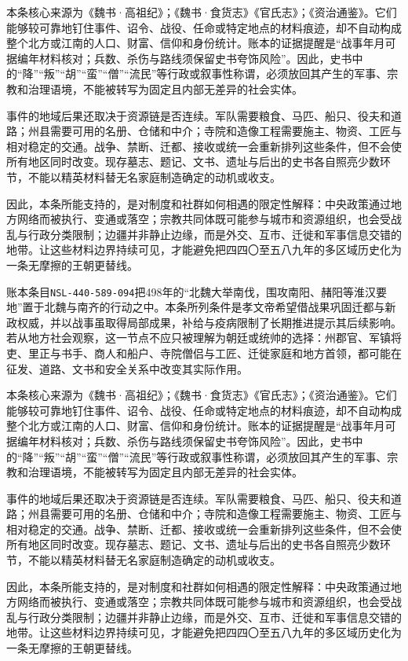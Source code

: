 本条核心来源为《魏书·高祖纪》；《魏书·食货志》《官氏志》；《资治通鉴》。它们能够较可靠地钉住事件、诏令、战役、任命或特定地点的材料痕迹，却不自动构成整个北方或江南的人口、财富、信仰和身份统计。账本的证据提醒是“战事年月可据编年材料核对；兵数、杀伤与路线须保留史书夸饰风险”。因此，史书中的“降”“叛”“胡”“蛮”“僧”“流民”等行政或叙事性称谓，必须放回其产生的军事、宗教和治理语境，不能被转写为固定且内部无差异的社会实体。

事件的地域后果还取决于资源链是否连续。军队需要粮食、马匹、船只、役夫和道路；州县需要可用的名册、仓储和中介；寺院和造像工程需要施主、物资、工匠与相对稳定的交通。战争、禁断、迁都、接收或统一会重新排列这些条件，但不会使所有地区同时改变。现存墓志、题记、文书、遗址与后出的史书各自照亮少数环节，不能以精英材料替无名家庭制造确定的动机或收支。

因此，本条所能支持的，是对制度和社群如何相遇的限定性解释：中央政策通过地方网络而被执行、变通或落空；宗教共同体既可能参与城市和资源组织，也会受战乱与行政分类限制；边疆并非静止边缘，而是外交、互市、迁徙和军事信息交错的地带。让这些材料边界持续可见，才能避免把四四〇至五八九年的多区域历史化为一条无摩擦的王朝更替线。

账本条目\texttt{NSL-440-589-094}把498年的“北魏大举南伐，围攻南阳、赭阳等淮汉要地”置于北魏与南齐的行动之中。本条所列条件是孝文帝希望借战果巩固迁都与新政权威，并以战事虽取得局部成果，补给与疫病限制了长期推进提示其后续影响。若从地方社会观察，这一节点不应只被理解为朝廷或统帅的选择：州郡官、军镇将吏、里正与书手、商人和船户、寺院僧侣与工匠、迁徙家庭和地方首领，都可能在征发、道路、文书和安全关系中改变其实际作用。

本条核心来源为《魏书·高祖纪》；《魏书·食货志》《官氏志》；《资治通鉴》。它们能够较可靠地钉住事件、诏令、战役、任命或特定地点的材料痕迹，却不自动构成整个北方或江南的人口、财富、信仰和身份统计。账本的证据提醒是“战事年月可据编年材料核对；兵数、杀伤与路线须保留史书夸饰风险”。因此，史书中的“降”“叛”“胡”“蛮”“僧”“流民”等行政或叙事性称谓，必须放回其产生的军事、宗教和治理语境，不能被转写为固定且内部无差异的社会实体。

事件的地域后果还取决于资源链是否连续。军队需要粮食、马匹、船只、役夫和道路；州县需要可用的名册、仓储和中介；寺院和造像工程需要施主、物资、工匠与相对稳定的交通。战争、禁断、迁都、接收或统一会重新排列这些条件，但不会使所有地区同时改变。现存墓志、题记、文书、遗址与后出的史书各自照亮少数环节，不能以精英材料替无名家庭制造确定的动机或收支。

因此，本条所能支持的，是对制度和社群如何相遇的限定性解释：中央政策通过地方网络而被执行、变通或落空；宗教共同体既可能参与城市和资源组织，也会受战乱与行政分类限制；边疆并非静止边缘，而是外交、互市、迁徙和军事信息交错的地带。让这些材料边界持续可见，才能避免把四四〇至五八九年的多区域历史化为一条无摩擦的王朝更替线。


